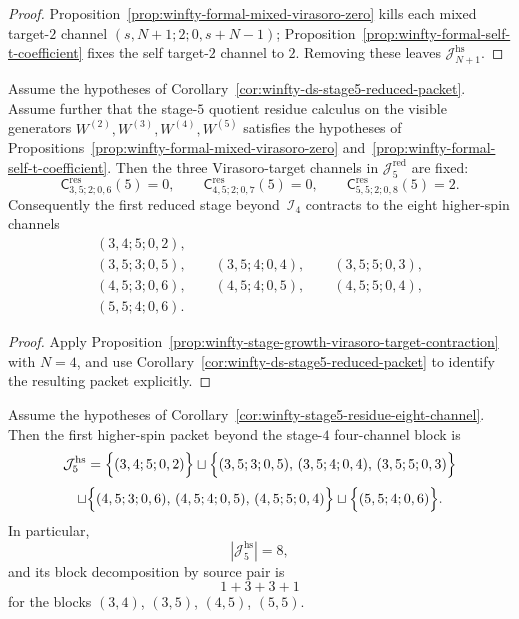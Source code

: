\begin{proof}
Proposition~\ref{prop:winfty-formal-mixed-virasoro-zero} kills each mixed target-$2$ channel $(s,N{+}1;2;0,s+N-1)$; Proposition~\ref{prop:winfty-formal-self-t-coefficient} fixes the self target-$2$ channel to $2$. Removing these leaves $\mathcal{J}_{N+1}^{\mathrm{hs}}$.
\end{proof}

\begin{corollary}
\label{cor:winfty-stage5-residue-eight-channel}
Assume the hypotheses of
Corollary~\ref{cor:winfty-ds-stage5-reduced-packet}. Assume further
that the stage-$5$ quotient residue calculus on the visible generators
$W^{(2)},W^{(3)},W^{(4)},W^{(5)}$ satisfies the hypotheses of
Propositions~\ref{prop:winfty-formal-mixed-virasoro-zero}
and~\ref{prop:winfty-formal-self-t-coefficient}. Then the three
Virasoro-target channels in $\mathcal{J}_5^{\mathrm{red}}$ are
fixed:
\[
\mathsf{C}^{\mathrm{res}}_{3,5;2;0,6}(5)=0,
\qquad
\mathsf{C}^{\mathrm{res}}_{4,5;2;0,7}(5)=0,
\qquad
\mathsf{C}^{\mathrm{res}}_{5,5;2;0,8}(5)=2.
\]
Consequently the first reduced stage beyond~$\mathcal{I}_4$ contracts
to the eight higher-spin channels
\[
\begin{gathered}
(3,4;5;0,2),\\
(3,5;3;0,5),\qquad
(3,5;4;0,4),\qquad
(3,5;5;0,3),\\
(4,5;3;0,6),\qquad
(4,5;4;0,5),\qquad
(4,5;5;0,4),\\
(5,5;4;0,6).
\end{gathered}
\]
\end{corollary}

\begin{proof}
Apply
Proposition~\ref{prop:winfty-stage-growth-virasoro-target-contraction}
with $N=4$, and use
Corollary~\ref{cor:winfty-ds-stage5-reduced-packet} to identify the
resulting packet explicitly.
\end{proof}

\begin{corollary}
\label{cor:winfty-stage5-higher-spin-packet}
Assume the hypotheses of
Corollary~\ref{cor:winfty-stage5-residue-eight-channel}. Then the
first higher-spin packet beyond the stage-$4$ four-channel block is
\[
\mathcal{J}_5^{\mathrm{hs}}
=
\Bigl\{
(3,4;5;0,2)
\Bigr\}
\sqcup
\Bigl\{
(3,5;3;0,5),\,
(3,5;4;0,4),\,
(3,5;5;0,3)
\Bigr\}
\]
\[
\sqcup
\Bigl\{
(4,5;3;0,6),\,
(4,5;4;0,5),\,
(4,5;5;0,4)
\Bigr\}
\sqcup
\Bigl\{
(5,5;4;0,6)
\Bigr\}.
\]
In particular,
\[
|\mathcal{J}_5^{\mathrm{hs}}|=8,
\]
and its block decomposition by source pair is
\[
1+3+3+1
\]
for the blocks
$(3,4)$, $(3,5)$, $(4,5)$, $(5,5)$.
\end{corollary}

